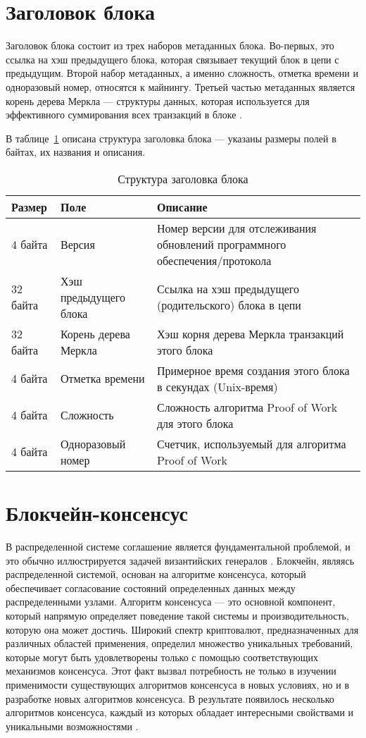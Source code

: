 \section{Заголовок блока}

Заголовок блока состоит из трех наборов метаданных блока. Во-первых, это ссылка на хэш предыдущего блока, которая связывает текущий блок в цепи с предыдущим. Второй набор метаданных, а именно сложность, отметка времени и одноразовый номер, относятся к майнингу. Третьей частью метаданных является корень дерева Меркла --- структуры данных, которая используется для эффективного суммирования всех транзакций в блоке \cite[165]{Antonopoulos2010}.

В таблице~\ref{tabular:headerstructure} описана структура заголовка блока --- указаны размеры полей в байтах, их названия и описания.

\begin{table}[H]
\caption{Структура заголовка блока}
\label{tabular:headerstructure}
\begin{tabular}{|p{3.5cm}|p{4.5cm}|p{7cm}|}
\hline
\textbf{Размер} & \textbf{Поле} & \textbf{Описание}
\tabularnewline
\hline
4 байта & Версия & Номер версии для отслеживания обновлений программного обеспечения/протокола
\tabularnewline
\hline
32 байта & Хэш предыдущего блока & Ссылка на хэш предыдущего (родительского) блока в цепи
\tabularnewline
\hline
32 байта & Корень дерева Меркла & Хэш корня дерева Меркла транзакций этого блока
\tabularnewline
\hline
4 байта & Отметка времени & Примерное время создания этого блока в секундах (Unix-время)
\tabularnewline
\hline
4 байта & Сложность & Сложность алгоритма Proof of Work для этого блока
\tabularnewline
\hline
4 байта & Одноразовый номер & Счетчик, используемый для алгоритма Proof of Work
\tabularnewline
\hline
\end{tabular}
\end{table}

\section{Блокчейн-консенсус}

В распределенной системе соглашение является фундаментальной проблемой, и это обычно иллюстрируется задачей византийских генералов \cite{Lamport1982}. 
Блокчейн, являясь распределенной системой, основан на алгоритме консенсуса, который обеспечивает согласование состояний определенных данных между распределенными узлами. 
Алгоритм консенсуса --- это основной компонент, который напрямую определяет поведение такой системы и производительность, которую она может достичь. 
Широкий спектр криптовалют, предназначенных для различных областей применения, определил множество уникальных требований, которые могут быть удовлетворены только с помощью соответствующих механизмов консенсуса. 
Этот факт вызвал потребность не только в изучении применимости существующих алгоритмов консенсуса в новых условиях, но и в разработке новых алгоритмов консенсуса. 
В результате появилось несколько алгоритмов консенсуса, каждый из которых обладает интересными свойствами и уникальными возможностями \cite{Sadek2020}.

